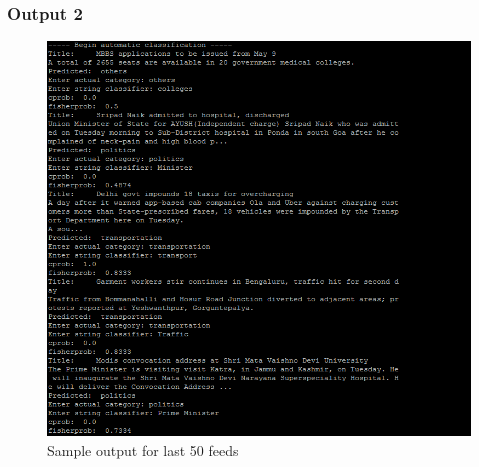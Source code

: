 \subsubsection{Output 2}
\begin{figure}[ht]    
    \begin{center}
        \includegraphics[scale=0.8]{output_last50.png}
        \caption{Sample output for last 50 feeds}
        \label{Samplet2}
    \end{center}
\end{figure}
\newpage
